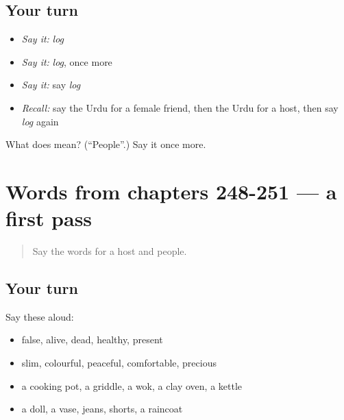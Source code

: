 \subsection*{Your turn}
\begin{itemize}
\raggedright
  \item \emph{Say it:} \emph{log}
  \item \emph{Say it:} \emph{log}, once more
  \item \emph{Say it:} say \emph{log}
  \item \emph{Recall:} say the Urdu for a female friend, then the Urdu for a host, then say \emph{log} again
\end{itemize}

\begin{tcolorbox}[breakable,colback=teal!4,colframe=teal!35!black,title={Before you move on}]
What does  mean? (\textquotedblleft{}People\textquotedblright{}.) Say it once more.
\end{tcolorbox}
\section[(dialogue)]{Words from chapters 248-251 — a first pass}

\label{lesson:UR-R256-first-pass-words-from-chapters-248-251}



\begin{quote}
Say the words for a host and people.
\end{quote}

\subsection*{Your turn}
Say these aloud:

\begin{itemize}
\raggedright
  \item false, alive, dead, healthy, present
  \item slim, colourful, peaceful, comfortable, precious
  \item a cooking pot, a griddle, a wok, a clay oven, a kettle
  \item a doll, a vase, jeans, shorts, a raincoat
\end{itemize}

